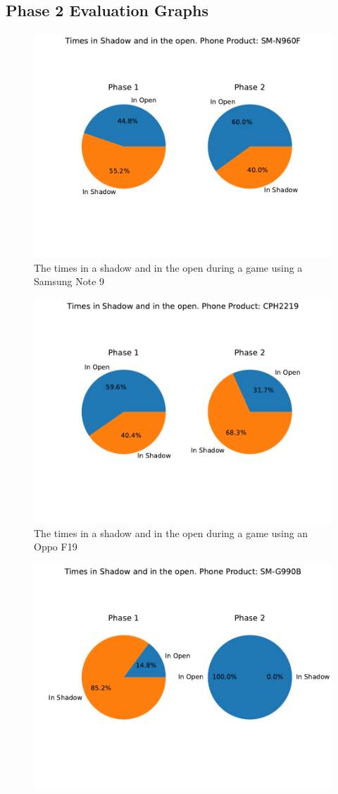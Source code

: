 \documentclass{l4proj}
\begin{document}
\begin{appendices}
\chapter{Phase 2 Evaluation Graphs}
\begin{figure}
    \centering
    \includegraphics[width=0.8\linewidth]{images/SM-N960F_piechart.pdf}
    \caption{The times in a shadow and in the open during a game using a Samsung Note 9}
    \label{fig:shadownote9}
\end{figure}
\begin{figure}
    \centering
    \includegraphics[width=0.8\linewidth]{images/CPH2219_piechart.pdf}
    \caption{The times in a shadow and in the open during a game using an Oppo F19}
    \label{fig:shadowoppo}
\end{figure}
\begin{figure}
    \centering
    \includegraphics[width=0.8\linewidth]{images/SM-G990B_piechart.pdf}

\end{figure}
\end{appendices}
\end{document}
